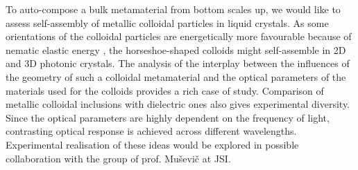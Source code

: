 \documentclass[a4paper,11pt]{article}
\begin{document}



To auto-compose a bulk metamaterial from bottom scales up, we would like to assess self-assembly of metallic colloidal particles in liquid crystals.
As some orientations of the colloidal particles are energetically more favourable because of nematic elastic energy \cite{musevic-2013-assembly,smalyukh-2009-assembly}, the horseshoe-shaped colloids might self-assemble in 2D and 3D photonic crystals. 
The analysis of the interplay between the influences of the geometry of such a colloidal metamaterial and the optical parameters of the materials used for the colloids provides a rich case of study. 
Comparison of metallic colloidal inclusions with dielectric ones also gives experimental diversity. 
Since the optical parameters are highly dependent on the frequency of light, contrasting optical response is achieved across different wavelengths. 
Experimental realisation of these ideas would be explored in possible collaboration with the group of prof. Muševič at JSI. 

\end{document}
